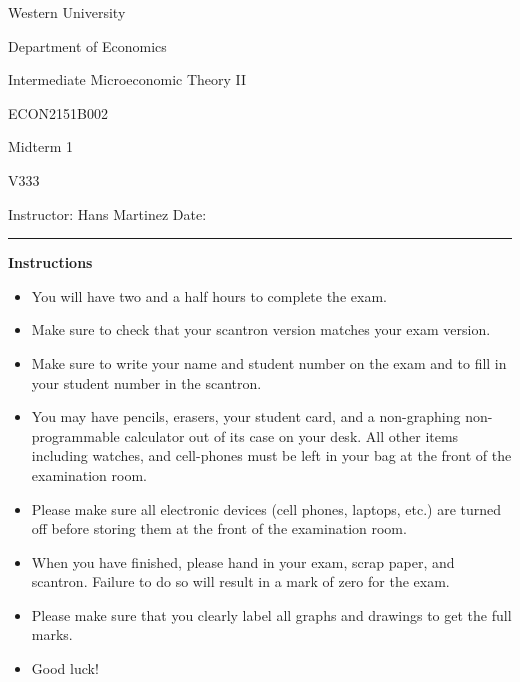 \documentclass[
  12pt,
  addpoints]{exam}
\begin{document}
\begin{titlepage}
    \centering
    {\LARGE Western University\par}
    {\Large Department of Economics\par}
    \vspace{1cm}
    {\large Intermediate Microeconomic Theory II \par
    ECON2151B002 \par
    Midterm 1 \par
    V333 \par}
    \vspace{1.5cm}
    Instructor: Hans Martinez \hfill Date:\enspace\rule{4cm}{0.4pt}\par
    \vspace{2cm}
    \raggedleft
    \vfill
    {\centering 
        {\bf Instructions \par}
    }
    \raggedleft
    \begin{itemize}
        \item You will have two and a half hours to complete the exam.
        \item Make sure to check that your scantron version matches your exam version.
        \item Make sure to write your name and student number on the exam and to fill in your student number in the scantron.
        \item You may have pencils, erasers, your student card, and a non-graphing non-programmable calculator out of its case on your desk. All other items including watches, and cell-phones must be left in your bag at the front of the examination room.
        \item Please make sure all electronic devices (cell phones, laptops, etc.) are turned off before storing them at the front of the examination room.
        \item When you have finished, please hand in your exam, scrap paper, and scantron. Failure to do so will result in a mark of zero for the exam.
        \item Please make sure that you clearly label all graphs and drawings to get the full marks.
        \item Good luck!
    \end{itemize}
\end{titlepage}
\newpage

\end{document}
